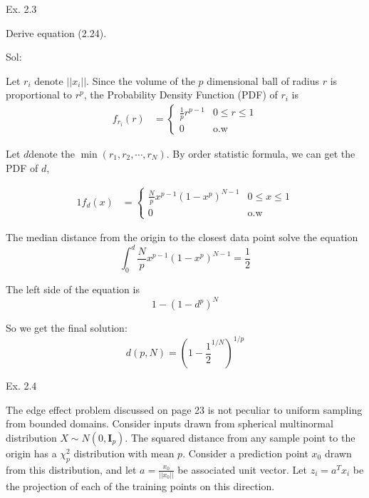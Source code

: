 \documentclass[english]{article}\usepackage[]{graphicx}\usepackage[]{color}
\begin{document}
Ex. 2.3

\vspace{0.5cm}

Derive equation (2.24).

\vspace{0.5cm}

Sol:

Let $r_{i}$ denote $||x_{i}||$. Since the volume of the $p$ dimensional
ball of radius $r$ is proportional to $r^{p}$, the Probability Density
Function (PDF) of $r_{i}$ is 
\begin{align*}
f_{r_{i}}(r) & =\begin{cases}
\frac{1}{p}r^{p-1} & 0\leq r\leq1\\
0 & \mathrm{o.w}
\end{cases}
\end{align*}

Let $d$denote the $\min(r_{1},r_{2},\cdots,r_{N})$. By order statistic
formula, we can get the PDF of $d$,

\begin{alignat*}{1}
f_{d}(x) & =\begin{cases}
\frac{N}{p}x^{p-1}(1-x^{p})^{N-1} & 0\leq x\leq1\\
0 & \mathrm{o.w}
\end{cases}
\end{alignat*}

The median distance from the origin to the closest data point solve
the equation
\[
\int_{0}^{d}\frac{N}{p}x^{p-1}(1-x^{p})^{N-1}=\frac{1}{2}
\]

The left side of the equation is 
\[
1-(1-d^{p})^{N}
\]

So we get the final solution: 
\[
d(p,N)=(1-\frac{1}{2}^{1/N})^{1/p}
\]

\vspace{0.5cm}

Ex. 2.4

\vspace{0.5cm}

The edge effect problem discussed on page 23 is not peculiar to uniform
sampling from bounded domains. Consider inputs drawn from spherical
multinormal distribution $X\sim N(0,\mathbf{I}_{p})$. The squared
distance from any sample point to the origin has a $\chi_{p}^{2}$
distribution with mean $p$. Consider a prediction point $x_{0}$
drawn from this distribution, and let $a=\frac{x_{0}}{||x_{0}||}$
be associated unit vector. Let $z_{i}=a^{T}x_{i}$ be the projection
of each of the training points on this direction.
\end{document}
